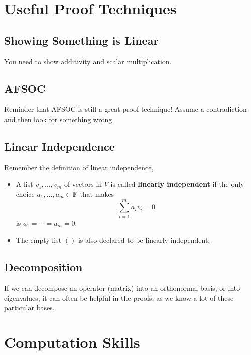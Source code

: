 \chapter{Useful Proof Techniques}

\section{Showing Something is Linear}

You need to show additivity and scalar multiplication.

\section{AFSOC}

Reminder that AFSOC is still a great proof technique! Assume a contradiction and then look for something wrong.

\section{Linear Independence}

Remember the definition of linear independence,
\begin{definition}
  \begin{itemize}
    \item A list $v_1, \dots, v_m$ of vectors in $V$ is called \textbf{linearly independent} if the only choice $a_1, \dots, a_m \in \mathbf{F}$ that makes
          \begin{equation*}
            \sum_{i=1}^m a_iv_i = 0
          \end{equation*}
          is $a_1 = \cdots = a_m = 0$.
    \item The empty list $()$ is also declared to be linearly independent.
  \end{itemize}
\end{definition}

\section{Decomposition}

If we can decompose an operator (matrix) into an orthonormal basis, or into eigenvalues, it can often be helpful in the proofs, as we know a lot of these particular bases.

\chapter{Computation Skills}

